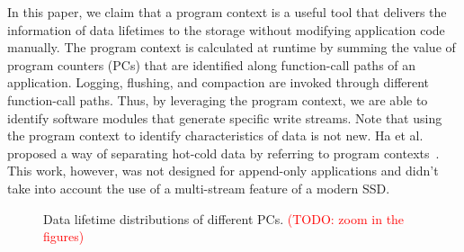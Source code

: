 In this paper, we claim that a program context is a useful tool that delivers
the information of data lifetimes to the storage without modifying application
code manually. The program context is calculated at runtime by summing the
value of program counters (PCs) that are identified along function-call paths
of an application.  Logging, flushing, and compaction are invoked through
different function-call paths.  Thus, by leveraging the program context, we are
able to identify software modules that generate specific write streams.  Note
that using the program context to identify characteristics of data is not new.
Ha et al. proposed a way of separating hot-cold data by referring to program
contexts~\cite{PCHa}. This work, however, was not designed for append-only
applications and didn't take into account the use of a multi-stream feature of
a modern SSD.

\begin{figure}[!t]
\centering
\hspace{1pt}
\hfill
\vspace{-10pt}
\caption{Data lifetime distributions of different PCs. \textcolor{red}{(TODO: zoom in the figures)}} 
\label{fig:types_and_PCs}
\vspace{-20pt}
\end{figure}

